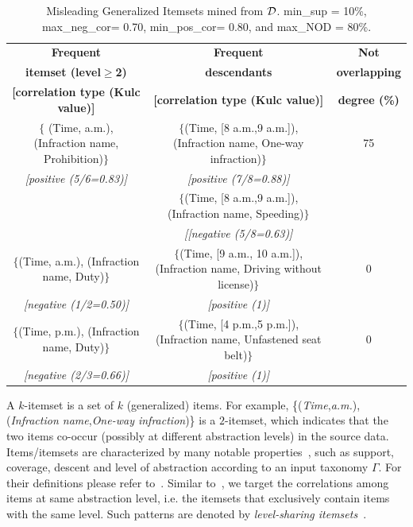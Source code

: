 \documentclass[10pt, conference, compsocconf]{IEEEtran}
\newcommand{\MGI}{{\sc M}isleading {\sc G}eneralized {\sc I}temset}
\begin{document}
\begin{table}[th!]
\scriptsize
\caption{\MGI{}s mined from $\cal{D}$. min\_sup = 10\%, max\_neg\_cor= 0.70, min\_pos\_cor= 0.80, and max\_NOD = 80\%.} \label{tab:exampleMGI}
\centering
\hspace{-1.5cm}
\begin{tabular}{|c|c|c|}
\hline 
 {\bf Frequent}       		& {\bf Frequent}                   & {\bf Not }    \\
 {\bf itemset (level$\geq$2)}    		& {\bf descendants}                 & {\bf overlapping} \\
 {\bf [correlation type (Kulc value)]}   	& {\bf [correlation type (Kulc value)]} &  {\bf degree (\%)}         \\
\hline
$\{$ (Time, a.m.), (Infraction name, Prohibition)$\}$    &   $\{$(Time, [8 a.m.,9 a.m.]), (Infraction name, One-way infraction)$\}$ & 75   \\
     \textit{[positive (5/6=0.83)]}       &    \textit{[positive (7/8=0.88)]}         &  \\
                                 &  $\{$(Time, [8 a.m.,9 a.m.]), (Infraction name, Speeding)$\}$    &  \\
                                 &    \textit{[[negative (5/8=0.63)]}              &  \\
\hline
 $\{$(Time, a.m.), (Infraction name, Duty)$\}$  &  $\{$(Time, [9 a.m., 10 a.m.]), (Infraction name, Driving without license)$\}$  & 0  \\
           \textit{[negative (1/2=0.50)]}                  & \textit{[positive (1)]} &  \\        
\hline
 $\{$(Time, p.m.), (Infraction name, Duty)$\}$  &  $\{$(Time, [4 p.m.,5 p.m.]), (Infraction name, Unfastened seat belt)$\}$  & 0   \\
           \textit{[negative (2/3=0.66)]}                  &  \textit{[positive (1)]} &  \\
\hline
\end{tabular}
\end{table}

A $k$-itemset is a set of $k$ (generalized) items. 
For example, \{(\textit{Time},\textit{a.m.}), (\textit{Infraction name},\textit{One-way infraction})\} is a $2$-itemset, 
which indicates that the two items co-occur (possibly at different abstraction levels) in the source data.  
Items/itemsets are characterized by many notable properties~\cite{Srikant1995}, such as support, coverage, descent and level of abstraction according to an input taxonomy $\Gamma$. 
For their definitions please refer to~\cite{Srikant1995,Han1999,MGI}. 
Similar to~\cite{Han1999,Flipping}, we target the correlations among items at same abstraction level, i.e. the itemsets that exclusively contain items with the same level. Such patterns are denoted by \textit{level-sharing itemsets}~\cite{Han1999}. 
\end{document}
